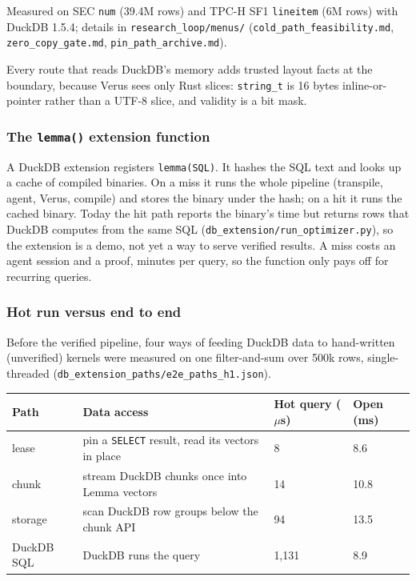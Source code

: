 \documentclass[
  10pt,
]{article}
\newcounter{none} %
\begin{document}
Measured on SEC \texttt{num} (39.4M rows) and TPC-H SF1
\texttt{lineitem} (6M rows) with DuckDB 1.5.4; details in
\texttt{research\_loop/menus/} (\texttt{cold\_path\_feasibility.md},
\texttt{zero\_copy\_gate.md}, \texttt{pin\_path\_archive.md}).

Every route that reads DuckDB's memory adds trusted layout facts at the
boundary, because Verus sees only Rust slices: \texttt{string\_t} is 16
bytes inline-or-pointer rather than a UTF-8 slice, and validity is a bit
mask.

\subsubsection{\texorpdfstring{The \texttt{lemma()} extension
function}{The lemma() extension function}}\label{the-lemma-extension-function}

A DuckDB extension registers
\texttt{lemma(\textquotesingle{}SQL\textquotesingle{})}. It hashes the
SQL text and looks up a cache of compiled binaries. On a miss it runs
the whole pipeline (transpile, agent, Verus, compile) and stores the
binary under the hash; on a hit it runs the cached binary. Today the hit
path reports the binary's time but returns rows that DuckDB computes
from the same SQL (\texttt{db\_extension/run\_optimizer.py}), so the
extension is a demo, not yet a way to serve verified results. A miss
costs an agent session and a proof, minutes per query, so the function
only pays off for recurring queries.

\subsubsection{Hot run versus end to
end}\label{hot-run-versus-end-to-end}

Before the verified pipeline, four ways of feeding DuckDB data to
hand-written (unverified) kernels were measured on one filter-and-sum
over 500k rows, single-threaded
(\texttt{db\_extension\_paths/e2e\_paths\_h1.json}).

{\def\LTcaptype{none} %
\begin{longtable}[]{@{}llll@{}}
\toprule\noalign{}
Path & Data access & Hot query (\ensuremath{\mu}s) & Open (ms) \\
\midrule\noalign{}
\endhead
\bottomrule\noalign{}
\endlastfoot
lease & pin a \texttt{SELECT} result, read its vectors in place & 8 &
8.6 \\
chunk & stream DuckDB chunks once into Lemma vectors & 14 & 10.8 \\
storage & scan DuckDB row groups below the chunk API & 94 & 13.5 \\
DuckDB SQL & DuckDB runs the query & 1,131 & 8.9 \\
\end{longtable}
}
\end{document}
